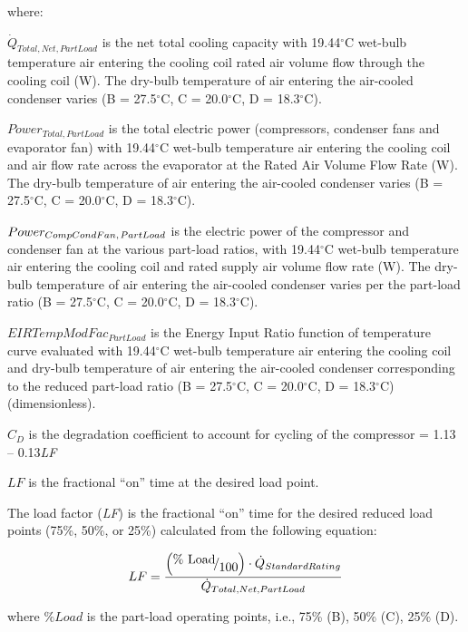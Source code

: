 where:

\({\dot Q_{Total,Net,PartLoad}}\) is the net total cooling capacity with 19.44\(^{\circ}\)C wet-bulb temperature air entering the cooling coil rated air volume flow through the cooling coil (W). The dry-bulb temperature of air entering the air-cooled condenser varies (B = 27.5\(^{\circ}\)C, C = 20.0\(^{\circ}\)C, D = 18.3\(^{\circ}\)C).

\(Powe{r_{Total,PartLoad}}\) is the total electric power (compressors, condenser fans and evaporator fan) with 19.44\(^{\circ}\)C wet-bulb temperature air entering the cooling coil and air flow rate across the evaporator at the Rated Air Volume Flow Rate (W). The dry-bulb temperature of air entering the air-cooled condenser varies (B = 27.5\(^{\circ}\)C, C = 20.0\(^{\circ}\)C, D = 18.3\(^{\circ}\)C).

\(Powe{r_{CompCondFan,{\kern 1pt} PartLoad}}\) is the electric power of the compressor and condenser fan at the various part-load ratios, with 19.44\(^{\circ}\)C wet-bulb temperature air entering the cooling coil and rated supply air volume flow rate (W). The dry-bulb temperature of air entering the air-cooled condenser varies per the part-load ratio (B = 27.5\(^{\circ}\)C, C = 20.0\(^{\circ}\)C, D = 18.3\(^{\circ}\)C).

\(EIRTempModFa{c_{PartLoad}}\) is the Energy Input Ratio function of temperature curve evaluated with 19.44\(^{\circ}\)C wet-bulb temperature air entering the cooling coil and dry-bulb temperature of air entering the air-cooled condenser corresponding to the reduced part-load ratio (B = 27.5\(^{\circ}\)C, C = 20.0\(^{\circ}\)C, D = 18.3\(^{\circ}\)C) (dimensionless).

\({C_D}\) is the degradation coefficient to account for cycling of the compressor = 1.13 -- 0.13\emph{LF}

\(LF\) is the fractional ``on'' time at the desired load point.

The load factor (\emph{LF}) is the fractional ``on'' time for the desired reduced load points (75\%, 50\%, or 25\%) calculated from the following equation:

\begin{equation}
LF = \frac{{\left( {{\raise0.7ex\hbox{{\% Load}} \!\mathord{\left/ {\vphantom {{\% Load} {100}}}\right.}\!\lower0.7ex\hbox{{100}}}} \right) \cdot {{\dot Q}_{StandardRating}}}}{{{{\dot Q}_{Total,Net,PartLoad}}}}
\end{equation}

where \(\% Load\) is the part-load operating points, i.e., 75\% (B), 50\% (C), 25\% (D).

